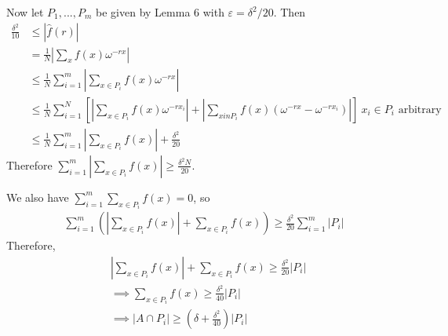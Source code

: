 \documentclass[a4paper]{article}
\begin{document}
Now let $P_1,...,P_m$ be given by Lemma 6 with $\varepsilon = \delta^2/20$. Then
\begin{equation*}
    \begin{aligned}
        \frac{\delta^2}{10} &\leq |\hat{f}(r)|\\
        &= \frac{1}{N} |\sum_x f(x) \omega^{-rx}|\\
        &\leq \frac{1}{N} \sum_{i=1}^m |\sum_{x \in P_i} f(x) \omega^{-rx}|\\
        &\leq \frac{1}{N} \sum_{i=1}^N \left[\left|\sum_{x \in P_i} f(x) \omega^{-rx_i}\right| + \left|\sum_{x in P_i} f(x) (\omega^{-rx} - \omega^{-rx_i})\right|\right] \ x_i \in P_i \text{ arbitrary}\\
        &\leq \frac{1}{N} \sum_{i=1}^m |\sum_{x \in P_i} f(x)| + \frac{\delta^2}{20}
    \end{aligned}
\end{equation*}
Therefore $\sum_{i=1}^m |\sum_{x \in P_i} f(x)| \geq \frac{\delta^2 N}{20}$.

We also have $\sum_{i=1}^m \sum_{x\in P_i} f(x) = 0$, so
\begin{equation*}
    \begin{aligned}
        \sum_{i=1}^m \left(\left|\sum_{x \in P_i} f(x) \right| + \sum_{x \in P_i}f(x) \right) \geq \frac{\delta^2}{20} \sum_{i=1}^m |P_i|
    \end{aligned}
\end{equation*}
Therefore, 
\begin{equation*}
    \begin{aligned}
        &|\sum_{x \in P_i} f(x)| + \sum_{x \in P_i} f(x) \geq \frac{\delta^2}{20} |P_i|\\
        &\implies \sum_{x \in P_i} f(x) \geq \frac{\delta^2}{40}|P_i|\\
        &\implies |A \cap P_i| \geq (\delta+\frac{\delta^2}{40})|P_i|
    \end{aligned}
\end{equation*}
\end{document}
